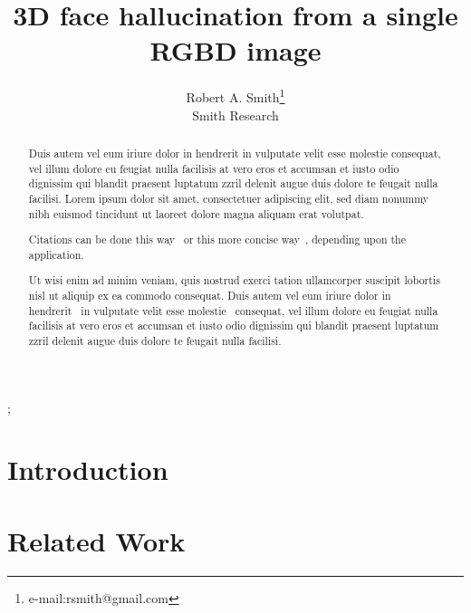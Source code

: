 \documentclass[annual]{acmsiggraph}
\title{3D face hallucination from a single RGBD image}
\author{Robert A. Smith\thanks{e-mail:rsmith@gmail.com}\\Smith Research}
\begin{document}

\maketitle

\begin{abstract}

Duis autem vel eum iriure dolor in hendrerit in vulputate velit esse
molestie consequat, vel illum dolore eu feugiat nulla facilisis at 
vero eros et accumsan et iusto odio dignissim qui blandit praesent
luptatum zzril delenit augue duis dolore te feugait nulla
facilisi. Lorem ipsum dolor sit amet, consectetuer adipiscing elit,
sed diam nonummy nibh euismod tincidunt ut laoreet dolore magna
aliquam erat volutpat.

Citations can be done this way~\cite{Jobs95} or this more concise 
way~, depending upon the application.

Ut wisi enim ad minim veniam, quis nostrud exerci tation ullamcorper
suscipit lobortis nisl ut aliquip ex ea commodo consequat. Duis autem
vel eum iriure dolor in hendrerit~\cite{Pellacini:2005:LAH}
in vulputate velit esse molestie~\cite{notes2002} 
consequat, vel illum dolore eu feugiat nulla facilisis at vero eros et
accumsan et iusto odio dignissim qui blandit praesent luptatum zzril
delenit augue duis dolore te feugait nulla facilisi.~\cite{Park:2006:DSI}

\end{abstract}

\begin{CRcatlist}
  ;
\end{CRcatlist}

\keywordlist

\TOGlinkslist

\copyrightspace

\section{Introduction}



\section{Related Work}
\end{document}
